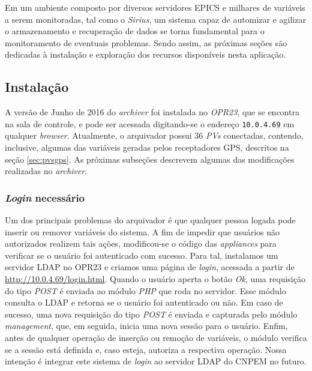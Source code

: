 \vspace{12pt}


Em um ambiente composto por diversos servidores EPICS e milhares de variáveis a
serem monitoradas, tal como o \textit{Sirius}, um sistema capaz de automizar e
agilizar o armazenamento e recuperação de dados se torna fundamental para o
monitoramento de eventuais problemas. Sendo assim, as próximas seções são
dedicadas à instalação e exploração dos recursos disponíveis nesta aplicação.

\subsection {Instalação}

A versão de Junho de 2016 do \textit{archiver} foi instalada no \textit{OPR23},
que se encontra na sala de controle, e pode ser acessada digitando-se o endereço
\texttt{10.0.4.69} em qualquer \textit{browser}. Atualmente, o arquivador possui
36 \textit{PVs} conectadas, contendo, inclusive, algumas das variáveis geradas
pelos receptadores GPS, descritos na seção \ref{sec:pvsgps}. As próximas
subseções descrevem algumas das modificações realizadas no \textit{archiver}.

\subsubsection{\textit{Login} necessário}

Um dos principais problemas do arquivador é que qualquer pessoa logada
pode inserir ou remover variáveis do sistema. A fim de impedir que usuários não
autorizados realizem tais ações, modificou-se o código das
\textit{appliances} para verificar se o usuário foi autenticado com sucesso.
Para tal, instalamos um servidor LDAP no OPR23 e criamos uma página
de \textit{login}, acessada a partir de \url{http://10.0.4.69/login.html}. Quando o
usuário aperta o botão \textit{Ok}, uma requisição do tipo \textit{POST} é
enviada ao módulo \textit{PHP} que roda no servidor. Esse módulo consulta o LDAP
e retorna se o usuário foi autenticado ou não. Em caso de sucesso, uma nova
requisição do tipo \textit{POST} é enviada e capturada pelo módulo
\textit{management}, que, em seguida, inicia uma nova sessão para o usuário.
Enfim, antes de qualquer operação de inserção ou remoção de variáveis, o
módulo verifica se a sessão está definida e, caso esteja, autoriza a respectiva
operação. Nossa intenção é integrar este sistema de \textit{login} ao servidor
LDAP do CNPEM no futuro.

